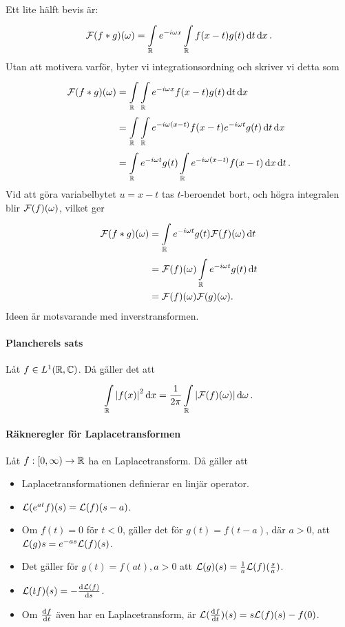 \proof
Ett lite hälft bevis är:
\begin{align*}
	\mathcal{F}(f * g)(\omega) = \int\limits_{\mathbb{R}}^{}e^{-i\omega x}\int\limits_{\mathbb{R}}^{}f(x - t)g(t)\dd{t}\dd{x}.
\end{align*}
Utan att motivera varför, byter vi integrationsordning och skriver vi detta som
\begin{align*}
	\mathcal{F}(f * g)(\omega) &= \int\limits_{\mathbb{R}}^{}\int\limits_{\mathbb{R}}^{}e^{-i\omega x}f(x - t)g(t)\dd{t}\dd{x} \\
	                          &= \int\limits_{\mathbb{R}}^{}\int\limits_{\mathbb{R}}^{}e^{-i\omega(x - t)}f(x - t)e^{-i\omega t}g(t)\dd{t}\dd{x} \\
	                          &= \int\limits_{\mathbb{R}}^{}e^{-i\omega t}g(t)\int\limits_{\mathbb{R}}^{}e^{-i\omega(x - t)}f(x - t)\dd{x}\dd{t}.
\end{align*}
Vid att göra variabelbytet $u = x - t$ tas $t$-beroendet bort, och högra integralen blir $\mathcal{F}(f)(\omega)$, vilket ger
\begin{align*}
	\mathcal{F}(f * g)(\omega) &= \int\limits_{\mathbb{R}}^{}e^{-i\omega t}g(t)\mathcal{F}(f)(\omega)\dd{t} \\
	                          &= \mathcal{F}(f)(\omega)\int\limits_{\mathbb{R}}^{}e^{-i\omega t}g(t)\dd{t} \\
	                          &= \mathcal{F}(f)(\omega)\mathcal{F}(g)(\omega).
\end{align*}
Ideen är motsvarande med inverstransformen.

\paragraph{Plancherels sats}
Låt $f\in L^{1}(\mathbb{R}, \mathbb{C})$. Då gäller det att
\begin{align*}
	\int\limits_{\mathbb{R}}^{}\abs{f(x)}^{2}\dd{x} = \frac{1}{2\pi}\int\limits_{\mathbb{R}}^{}\abs{\mathcal{F}(f)(\omega)}\dd{\omega}.
\end{align*}

\proof

\paragraph{Räkneregler för Laplacetransformen}
Låt $f: [0, \infty)\to\mathbb{R}$ ha en Laplacetransform. Då gäller att
\begin{itemize}
	\item Laplacetransformationen definierar en linjär operator.
	\item $\mathcal{L}(e^{at}f)(s) = \mathcal{L}(f)(s - a)$.
	\item Om $f(t) = 0$ för $t < 0$, gäller det för $g(t) = f(t - a)$, där $a > 0$, att $\mathcal{L}(g){s} = e^{-as}\mathcal{L}(f)(s)$.
	\item Det gäller för $g(t) = f(at), a > 0$ att $\mathcal{L}(g)(s) = \frac{1}{a}\mathcal{L}(f)(\frac{s}{a})$.
	\item $\mathcal{L}(tf)(s) = -\dv[]{\mathcal{L}(f)}{s} (s)$.
	\item Om $\dv{f}{t}$ även har en Laplacetransform, är $\mathcal{L}(\dv{f}{t})(s) = s\mathcal{L}(f)(s) - f(0)$.
\end{itemize}

